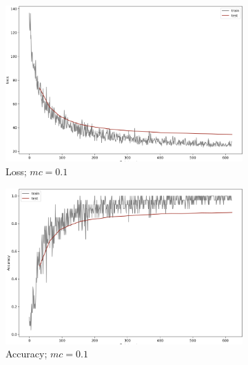 \begin{figure}[]\ContinuedFloat
     \begin{subfigure}[b]{0.48\textwidth}
         \centering
         \includegraphics[width=\textwidth]{observational/img/bnn/mc/LC_mc0.1.png}
         \caption{Loss; $mc=0.1$}
     \end{subfigure}
     \hfill
     \begin{subfigure}[b]{0.48\textwidth}
         \centering
         \includegraphics[width=\textwidth]{observational/img/bnn/mc/AC_mc0.1.png}
         \caption{Accuracy; $mc=0.1$}
     \end{subfigure} 
     \par\bigskip
     \begin{subfigure}[b]{0.48\textwidth}
         \centering

\end{subfigure}
\end{figure}
